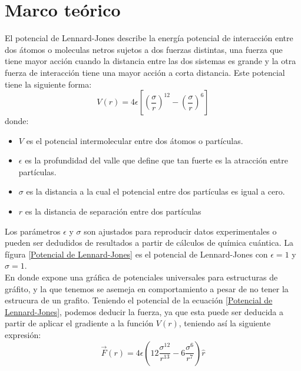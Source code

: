 \documentclass[reprint,amsmath,amssymb,aps,]{revtex4-2}
\begin{document}
\section{Marco teórico}
El potencial de Lennard-Jones describe la energía potencial de interacción entre dos átomos o moleculas netros sujetos a dos fuerzas distintas, una fuerza que tiene mayor acción cuando la distancia entre las dos sistemas es grande y la otra fuerza de interacción tiene una mayor acción a corta distancia. Este potencial tiene la siguiente forma:
\begin{equation}
    \label{Potencial de Lennard-Jones}
    V(r) = 4 \epsilon \left[\left(\frac{\sigma}{r} \right)^{12} - \left(\frac{\sigma}{r} \right)^6 \right]
\end{equation}
donde:
\begin{itemize}
    \item $V$ es el potencial intermolecular entre dos átomos o partículas.
    \item $\epsilon$ es la profundidad del valle que define que tan fuerte es la atracción entre partículas.
    \item $\sigma$ es la distancia a la cual el potencial entre dos partículas es igual a cero.
    \item $r$ es la distancia de separación entre dos partículas
\end{itemize}
Los parámetros $\epsilon$ y $\sigma$ son ajustados para reproducir datos experimentales o pueden ser dedudidos de resultados a partir de cálculos de química cuántica. La fígura \ref{Potencial de Lennard-Jones} es el potencial de Lennard-Jones con $\epsilon=1$ y $\sigma=1$.\\
En donde \cite{Girifalco2000} expone una gráfica de potenciales universales para estructuras de gráfito, y la que tenemos se asemeja en comportamiento a pesar de no tener la estrucura de un grafito.
Teniendo el potencial de la ecuación \ref{Potencial de Lennard-Jones}, podemos deducir la fuerza, ya que esta puede ser deducida a partir de aplicar el gradiente a la función $V(r)$, teniendo así la siguiente expresión:
\begin{equation}
    \label{eq:fuerzateo}
    \vec{F}(r)= 4\epsilon \left(12\frac{\sigma^{12}}{r^{13}}- 6 \frac{\sigma^6}{r^7} \right) \hat{r}
\end{equation}
\end{document}

